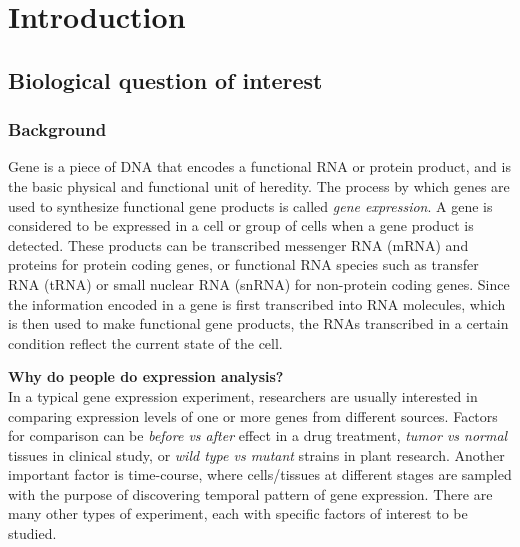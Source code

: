 \section{Introduction}\label{sec:intro}

\subsection{Biological question of interest}\label{subsec:biol}

\subsubsection{Background}

Gene is a piece of DNA that encodes a functional RNA or protein product, and is the basic physical
and functional unit of heredity. The process by which genes are used to synthesize functional gene
products is called \textit{gene expression}.  A gene is considered to be expressed in a cell or
group of cells when a gene product is detected.
These products can be transcribed messenger RNA (mRNA) and proteins for protein coding genes, or
functional RNA species such as transfer RNA (tRNA) or small nuclear RNA (snRNA) for non-protein
coding genes.
Since the information encoded in a gene is first transcribed into RNA molecules, which is then used
to make functional gene products, the RNAs transcribed
in a certain condition reflect the current state of the cell.







\textbf{Why do people do expression analysis?}\\
In a typical gene expression experiment, researchers are usually interested in comparing expression
levels of one or more genes from different sources. Factors for comparison can be
\textit{before vs
	after} effect in a drug treatment, \textit{tumor vs normal} tissues in clinical study, or
\textit{wild type vs mutant} strains in plant research. Another important factor is time-course,
where cells/tissues at different stages are sampled with the purpose of discovering temporal pattern
of gene expression. There are many other types of experiment, each with specific factors of interest
to be studied.


